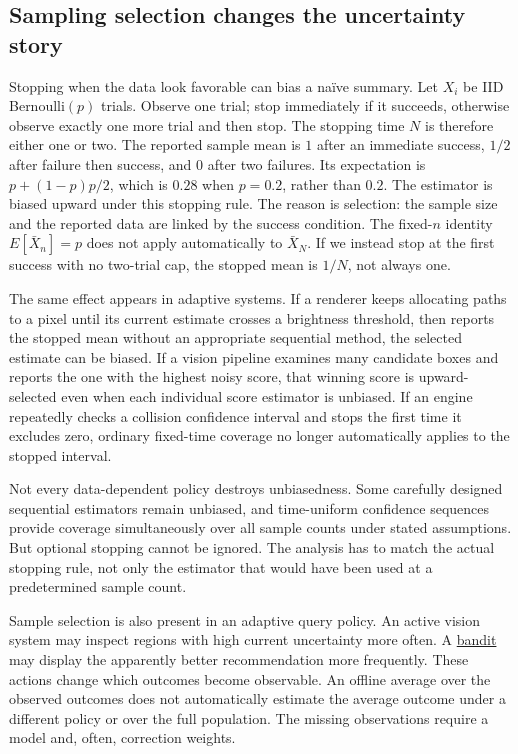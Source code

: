 \subsection{Sampling selection changes the uncertainty story}\label{02-foundations-ii-ch029-sampling-selection-changes-the-uncertainty-story}

Stopping when the data look favorable can bias a naïve summary. Let \(X_i\) be IID Bernoulli\((p)\) trials. Observe one trial; stop immediately if it succeeds, otherwise observe exactly one more trial and then stop. The stopping time \(N\) is therefore either one or two. The reported sample mean is \(1\) after an immediate success, \(1/2\) after failure then success, and \(0\) after two failures. Its expectation is \(p+(1-p)p/2\), which is \(0.28\) when \(p=0.2\), rather than \(0.2\). The estimator is biased upward under this stopping rule. The reason is selection: the sample size and the reported data are linked by the success condition. The fixed-\(n\) identity \(E[\bar X_n]=p\) does not apply automatically to \(\bar X_N\). If we instead stop at the first success with no two-trial cap, the stopped mean is \(1/N\), not always one.

The same effect appears in adaptive systems. If a renderer keeps allocating paths to a pixel until its current estimate crosses a brightness threshold, then reports the stopped mean without an appropriate sequential method, the selected estimate can be biased. If a vision pipeline examines many candidate boxes and reports the one with the highest noisy score, that winning score is upward-selected even when each individual score estimator is unbiased. If an engine repeatedly checks a collision confidence interval and stops the first time it excludes zero, ordinary fixed-time coverage no longer automatically applies to the stopped interval.

Not every data-dependent policy destroys unbiasedness. Some carefully designed sequential estimators remain unbiased, and time-uniform confidence sequences provide coverage simultaneously over all sample counts under stated assumptions. But optional stopping cannot be ignored. The analysis has to match the actual stopping rule, not only the estimator that would have been used at a predetermined sample count.

Sample selection is also present in an adaptive query policy. An active vision system may inspect regions with high current uncertainty more often. A \hyperref[appendix-3dc863dbddf3]{bandit} may display the apparently better recommendation more frequently. These actions change which outcomes become observable. An offline average over the observed outcomes does not automatically estimate the average outcome under a different policy or over the full population. The missing observations require a model and, often, correction weights.

